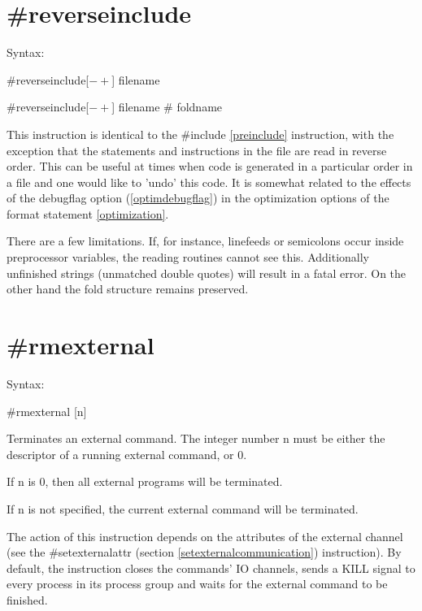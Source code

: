 
\section{\#reverseinclude}
\label{prereverseinclude}

\noindent Syntax:

\#reverseinclude[$-+$] filename

\#reverseinclude[$-+$] filename \# foldname

\noindent This instruction is identical to the \#include \ref{preinclude} 
instruction, with the exception that the statements and instructions in the 
file are read in reverse order. This can be useful at times when code is 
generated in a particular order in a file and one would like to 'undo' this 
code. It is somewhat related to the effects of the debugflag option 
(\ref{optimdebugflag}) in the optimization options of the format statement 
\ref{optimization}.

There are a few limitations. If, for instance, linefeeds or semicolons 
occur inside preprocessor variables, the reading routines cannot see this. 
Additionally unfinished strings (unmatched double quotes) will result in 
a fatal error. On the other hand the fold structure remains preserved.


\section{\#rmexternal}
\label{prermexternal}

\noindent Syntax:

\#rmexternal [n]

\noindent Terminates an external command. The integer 
number n must be either the descriptor of a running external command, or 0.

If n is 0, then all external programs will be terminated.

If n is not specified, the current external command will be terminated.

The action of this instruction depends on the attributes of the external 
channel (see the \#setexternalattr (section 
\ref{setexternalcommunication}) instruction). By default, the instruction 
closes the commands' IO channels, sends a KILL signal to 
every process in its process group and waits for the external command to be 
finished.

